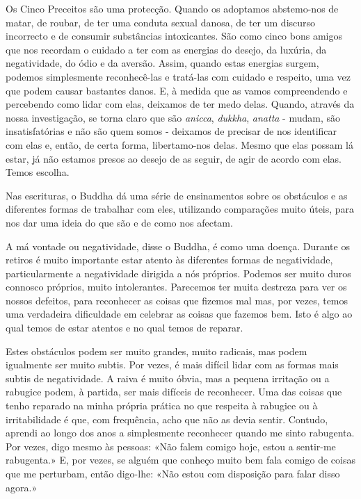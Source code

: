 Os Cinco Preceitos são uma protecção. Quando os adoptamos abstemo-nos de
matar, de roubar, de ter uma conduta sexual danosa, de ter um discurso
incorrecto e de consumir substâncias intoxicantes. São como cinco bons
amigos que nos recordam o cuidado a ter com as energias do desejo, da
luxúria, da negatividade, do ódio e da aversão. Assim, quando estas
energias surgem, podemos simplesmente reconhecê-las e tratá-las com
cuidado e respeito, uma vez que podem causar bastantes danos. E, à
medida que as vamos compreendendo e percebendo como lidar com elas,
deixamos de ter medo delas. Quando, através da nossa investigação, se
torna claro que são \emph{anicca}, \emph{dukkha}, \emph{anatta} - mudam,
são insatisfatórias e não são quem somos - deixamos de precisar de nos
identificar com elas e, então, de certa forma, libertamo-nos delas.
Mesmo que elas possam lá estar, já não estamos presos ao desejo de as
seguir, de agir de acordo com elas. Temos escolha.

Nas escrituras, o Buddha dá uma série de ensinamentos sobre os
obstáculos e as diferentes formas de trabalhar com eles, utilizando
comparações muito úteis, para nos dar uma ideia do que são e de como nos
afectam.

A má vontade ou negatividade, disse o Buddha, é como uma doença. Durante
os retiros é muito importante estar atento às diferentes formas de
negatividade, particularmente a negatividade dirigida a nós próprios.
Podemos ser muito duros connosco próprios, muito intolerantes. Parecemos
ter muita destreza para ver os nossos defeitos, para reconhecer as
coisas que fizemos mal mas, por vezes, temos uma verdadeira dificuldade
em celebrar as coisas que fazemos bem. Isto é algo ao qual temos de
estar atentos e no qual temos de reparar.

Estes obstáculos podem ser muito grandes, muito radicais, mas podem
igualmente ser muito subtis. Por vezes, é mais difícil lidar com as
formas mais subtis de negatividade. A raiva é muito óbvia, mas a pequena
irritação ou a rabugice podem, à partida, ser mais difíceis de
reconhecer. Uma das coisas que tenho reparado na minha própria prática
no que respeita à rabugice ou à irritabilidade é que, com frequência,
acho que não as devia sentir. Contudo, aprendi ao longo dos anos a
simplesmente reconhecer quando me sinto rabugenta. Por vezes, digo mesmo
às pessoas: «Não falem comigo hoje, estou a sentir-me rabugenta.» E, por
vezes, se alguém que conheço muito bem fala comigo de coisas que me
perturbam, então digo-lhe: «Não estou com disposição para falar disso
agora.»

